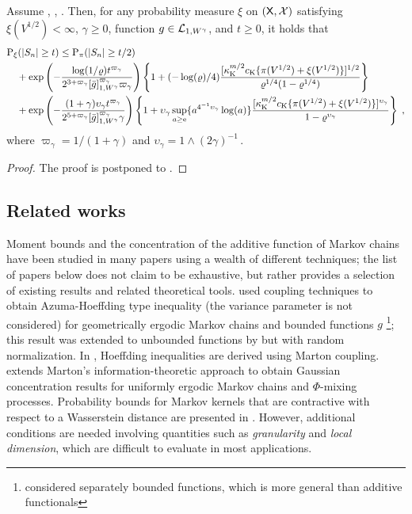 \documentclass[sn-mathphys,Numbered]{sn-jnl}%
\begin{document}
\begin{theorem}
\label{th:rosenthal_log_V_cor_2_wasserstein_non_statio}
Assume , , . Then,  for any probability measure $\xi$ on $(\Xset,\Xsigma)$ satisfying $\xi(V^{1/2}) < \infty$,  $\gamma \geq 0$,  function $g \in \Lclass_{1, W^\gamma}$, and  $t \geq 0$, it holds that
\begin{align*}
&\PP_{\xi}(|S_n| \geq t) \leq
  \PP_{\pi}(|S_n| \geq t/2) \\
&\quad   +  \exp\parenthese{-\frac{\log(1/\ratewas) t^{\varpi_{\gamma}}}{2^{3+\varpi_{\gamma}} \Nnorm[1,W^\gamma]{\bar{g}}^{\varpi_{\gamma}} \varpi_{\gamma}}}\defEns{1+(-\log(\ratewas)/4)\frac{[ \boundmetric^{m/2}  \vartconstwas \{\pi(V^{1/2}) + \xi(V^{1/2})\}]^{1/2}}{\ratewas^{1/4}(1-\ratewas^{1/4})}} \\
  &\quad   +\exp\parenthese{-\frac{ (1+\gamma)\upsilon_{\gamma} t^{\varpi_{\gamma}}}{2^{5+\varpi_{\gamma}} \Nnorm[1,W^\gamma]{\bar{g}}^{\varpi_{\gamma}} \gamma }}\defEns{1+ \upsilon_{\gamma} \sup_{a \geq \rme} \{a^{4^{-1}\upsilon_{\gamma}}\log(a)\} \frac{[\boundmetric^{m/2}  \vartconstwas \{\pi(V^{1/2}) + \xi(V^{1/2})\}]^{\upsilon_{\gamma}}}{1-\ratewas^{\upsilon_{\gamma}}}}\eqsp,
\end{align*}
where $\varpi_{\gamma} = 1/(1+\gamma)$ and $\upsilon_{\gamma} = 1\wedge(2\gamma)^{-1}$\,.
\end{theorem}
\begin{proof}

The proof is postponed to .
\end{proof}
\subsection{Related works}
\label{sec:related-works}
Moment bounds and the concentration of the additive function of Markov chains have been studied in many papers using a wealth of different techniques; the list of papers below does not claim to be exhaustive, but rather provides a selection of existing results and related theoretical tools. \cite{dedecker2015subgaussian} used coupling techniques to obtain Azuma-Hoeffding type inequality (the variance parameter is not considered) for geometrically ergodic Markov chains and bounded functions $g$ \footnote{\cite{dedecker2015subgaussian} considered separately bounded functions, which is more general than additive functionals}; this result was extended to unbounded functions by \cite{wintenberger2017exponential} but with random normalization.
 In \cite{marton1996measure}, Hoeffding inequalities are derived using Marton coupling. \cite{samson2000concentration} extends Marton's information-theoretic approach to obtain Gaussian concentration results for uniformly ergodic Markov chains and $\Phi$-mixing processes.
Probability bounds for Markov kernels that are contractive with respect to a Wasserstein distance are presented in \cite{joulin:ollivier:2010}. However, additional conditions are needed involving quantities such as \textit{granularity} and \textit{local dimension}, which are difficult to evaluate in most applications.
\end{document}
